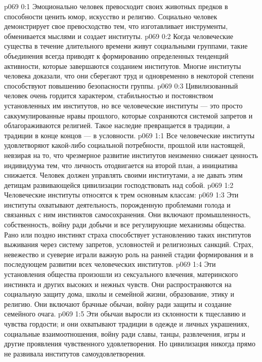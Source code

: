 \author{Мелхиседек}
\vs p069 0:1 Эмоционально человек превосходит своих животных предков в способности ценить юмор, искусство и религию. Социально человек демонстрирует свое превосходство тем, что изготавливает инструменты, обменивается мыслями и создает институты.
\vs p069 0:2 Когда человеческие существа в течение длительного времени живут социальными группами, такие объединения всегда приводят к формированию определенных тенденций активности, которые завершаются созданием институтов. Многие институты человека доказали, что они сберегают труд и одновременно в некоторой степени способствуют повышению безопасности группы.
\vs p069 0:3 Цивилизованный человек очень гордится характером, стабильностью и постоянством установленных им институтов, но все человеческие институты --- это просто саккумулированные нравы прошлого, которые сохраняются системой запретов и облагораживаются религией. Такое наследие превращается в традиции, а традиции в конце концов --- в условности.
\vs p069 1:1 Все человеческие институты удовлетворяют какой\hyp{}либо социальной потребности, прошлой или настоящей, невзирая на то, что чрезмерное развитие институтов неизменно снижает ценность индивидуума тем, что личность отодвигается на второй план, а инициатива снижается. Человек должен управлять своими институтами, а не давать этим детищам развивающейся цивилизации господствовать над собой.
\vs p069 1:2 \pc Человеческие институты относятся к трем основным классам:
\vs p069 1:3 \bibnobreakspace {} Эти институты охватывают деятельность, порожденную проблемами голода и связанных с ним инстинктов самосохранения. Они включают промышленность, собственность, войну ради добычи и все регулирующие механизмы общества. Рано или поздно инстинкт страха способствует установлению таких институтов выживания через систему запретов, условностей и религиозных санкций. Страх, невежество и суеверие играли важную роль на ранней стадии формирования и в последующем развитии всех человеческих институтов.
\vs p069 1:4 \bibnobreakspace {} Эти установления общества произошли из сексуального влечения, материнского инстинкта и других высоких и нежных чувств. Они распространяются на социальную защиту дома, школы и семейной жизни, образование, этику и религию. Они включают брачные обычаи, войну ради защиты и создание семейного очага.
\vs p069 1:5 \bibnobreakspace {} Эти обычаи выросли из склонности к тщеславию и чувства гордости; и они охватывают традиции в одежде и личных украшениях, социальные взаимоотношения, войну ради славы, танцы, развлечения, игры и другие проявления чувственного удовлетворения. Но цивилизация никогда прямо не развивала институтов самоудовлетворения.

